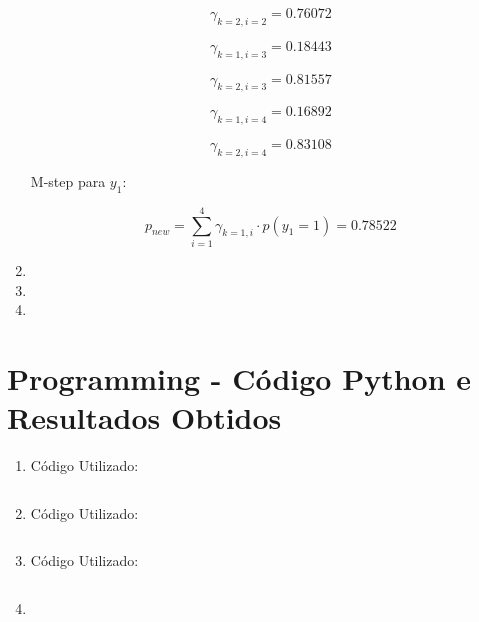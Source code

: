 \documentclass[a4paper,12pt]{article} %
\begin{document}
\begin{enumerate}
\begin{equation*}
    \gamma_{k=2,i=2} = 0.76072
\end{equation*}

\begin{equation*}
    \gamma_{k=1,i=3} = 0.18443
\end{equation*}

\begin{equation*}
    \gamma_{k=2,i=3} = 0.81557
\end{equation*}

\begin{equation*}
    \gamma_{k=1,i=4} = 0.16892
\end{equation*}

\begin{equation*}
    \gamma_{k=2,i=4} = 0.83108
\end{equation*}

M-step para $y_1$:

\begin{equation*}
    p_{new} = \sum_{i=1}^{4} \gamma_{k=1,i} \cdot p(y_1 = 1) = 0.78522
\end{equation*}

\item

\item

\item

\end{enumerate}

\clearpage

\section*{Programming - Código Python e Resultados Obtidos}

\begin{enumerate}

\item 
Código Utilizado:

\begin{lstlisting}[language=Python]

\end{lstlisting}

\item 

Código Utilizado:

\begin{lstlisting}[language=Python]

\end{lstlisting}

\item

Código Utilizado:

\begin{lstlisting}[language=Python]

\end{lstlisting}

\item 
\end{enumerate}
\end{document}
